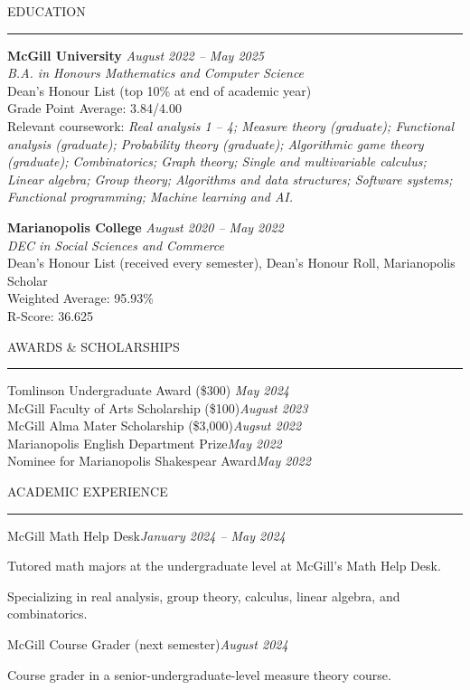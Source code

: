 \documentclass{resume}
\renewenvironment{rSection}[1]{
\sectionskip
\textcolor{CarnegieMellonRed}{\MakeUppercase{#1}}
\sectionlineskip
\hrule
\begin{list}{}{
\setlength{\leftmargin}{1.5em}
}
\item[]
}{
\end{list}
}
\begin{document}
\begin{rSection}{Education}
{\bf McGill University} \hfill {\em August 2022 -- May 2025} 
\\ \emph{B.A. in Honours Mathematics and Computer Science} \hfill
\vspace{0.1cm}
\\ Dean's Honour List (top 10\% at end of academic year)
\\ Grade Point Average: 3.84/4.00 \hfill
\\ Relevant coursework: \textit{Real analysis 1 -- 4; Measure theory (graduate); Functional analysis (graduate); Probability theory (graduate); Algorithmic game theory (graduate); Combinatorics; Graph theory; Single and multivariable calculus; Linear algebra; Group theory; Algorithms and data structures; Software systems; Functional programming; Machine learning and AI.}

{\bf Marianopolis College} \hfill {\em August 2020 -- May 2022} 
\\ \emph{DEC in Social Sciences and Commerce}
\vspace{0.1cm}
\\ Dean's Honour List (received every semester), Dean's Honour Roll, Marianopolis Scholar
\\ Weighted Average: 95.93\%
\\ R-Score: 36.625
\end{rSection}

\begin{rSection}{Awards \& Scholarships} \itemsep -2pt
{Tomlinson Undergraduate Award (\$300)} \hfill {\em May 2024} \\
{McGill Faculty of Arts Scholarship (\$100)}\hfill {\em August 2023} \\
{McGill Alma Mater Scholarship (\$3,000)}\hfill {\em Augsut 2022} \\
{Marianopolis English Department Prize}\hfill {\em May 2022} \\
{Nominee for Marianopolis Shakespear Award}\hfill {\em May 2022}
\end{rSection}

\begin{rSection}{Academic Experience}
\begin{rSubsection}{McGill Math Help Desk}{\em January 2024 -- May 2024}{} 

\item Tutored math majors at the undergraduate level at McGill's Math Help Desk.
\item Specializing in real analysis, group theory, calculus, linear algebra, and combinatorics.
\end{rSubsection}
\begin{rSubsection}{McGill Course Grader (next semester)}{\em August 2024}{} 

\item Course grader in a senior-undergraduate-level measure theory course.
\end{rSubsection}
\end{rSection}
\end{document}
